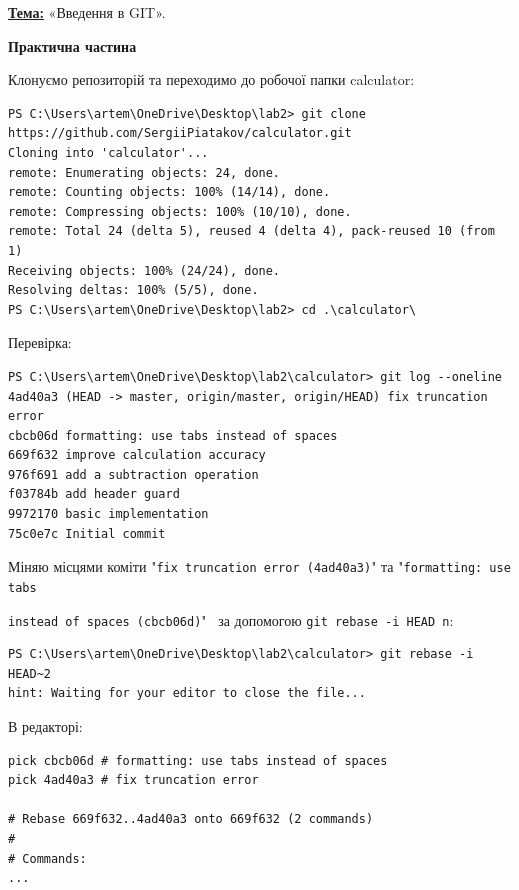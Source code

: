 \documentclass[a4paper,12pt]{article}
\begin{document}

    \setlength{\parindent}{0em}

    \textbf{\underline{Тема:}} «Введення в GIT».
    
    \vspace{1em}

    \begin{center} \textbf{\Large Практична частина} \end{center}

    Клонуємо репозиторій та переходимо до робочої папки calculator:
    \begin{verbatim}
PS C:\Users\artem\OneDrive\Desktop\lab2> git clone https://github.com/SergiiPiatakov/calculator.git
Cloning into 'calculator'...
remote: Enumerating objects: 24, done.
remote: Counting objects: 100% (14/14), done.
remote: Compressing objects: 100% (10/10), done.
remote: Total 24 (delta 5), reused 4 (delta 4), pack-reused 10 (from 1)
Receiving objects: 100% (24/24), done.
Resolving deltas: 100% (5/5), done.
PS C:\Users\artem\OneDrive\Desktop\lab2> cd .\calculator\
    \end{verbatim}

    Перевірка:
    \begin{verbatim}
PS C:\Users\artem\OneDrive\Desktop\lab2\calculator> git log --oneline
4ad40a3 (HEAD -> master, origin/master, origin/HEAD) fix truncation error
cbcb06d formatting: use tabs instead of spaces
669f632 improve calculation accuracy
976f691 add a subtraction operation
f03784b add header guard
9972170 basic implementation
75c0e7c Initial commit
    \end{verbatim}

    Міняю місцями коміти "\texttt{fix truncation error (4ad40a3)}" та "\texttt{formatting: use tabs}
    
    \texttt{instead of spaces (cbcb06d)}" \, за допомогою \texttt{git rebase -i HEAD~n}:
    \begin{verbatim}
PS C:\Users\artem\OneDrive\Desktop\lab2\calculator> git rebase -i HEAD~2
hint: Waiting for your editor to close the file...
    \end{verbatim}

    В редакторі:
    \begin{verbatim}
pick cbcb06d # formatting: use tabs instead of spaces
pick 4ad40a3 # fix truncation error

# Rebase 669f632..4ad40a3 onto 669f632 (2 commands)
#
# Commands:
...
    \end{verbatim}
\end{document}
